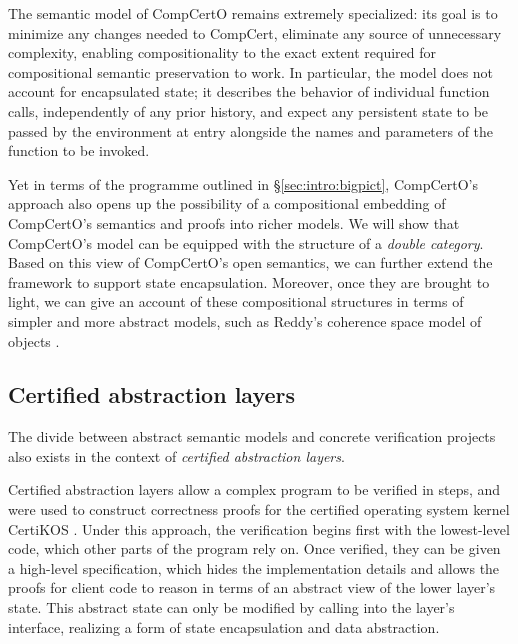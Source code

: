 \documentclass[acmsmall,screen,review,anonymous]{acmart}
\begin{document}
The semantic model of CompCertO
remains extremely specialized:
its goal is to minimize any changes needed to CompCert,
eliminate any source of unnecessary complexity,
enabling compositionality
to the exact extent required
for compositional semantic preservation to work.
In particular,
the model does not account for
encapsulated state;
it describes the behavior of individual function calls,
independently of any prior history,
and expect any persistent state
to be passed by the environment at entry
alongside the names and parameters of the function to be invoked.

Yet
in terms of the programme outlined in \S\ref{sec:intro:bigpict},
CompCertO's approach also opens up the possibility
of a compositional embedding
of CompCertO's semantics and proofs
into richer models.
We will show that CompCertO's model
can be equipped with the structure of
a \emph{double category}.
Based on this view
of CompCertO's open semantics,
we can further extend the framework
to support state encapsulation.
Moreover,
once they are brought to light,
we can give an account of
these compositional structures
in terms of simpler and more abstract models,
such as Reddy's
coherence space model of objects
\cite{objsem}.



\subsection{Certified abstraction layers} %

The divide between abstract semantic models
and concrete verification projects
also exists in the context of \emph{certified abstraction layers}.

Certified abstraction layers
allow a complex program to be verified in steps,
and were used to construct correctness proofs
for the certified operating system kernel CertiKOS
\cite{popl15,ccal}.
Under this approach,
the verification begins first with the lowest-level code,
which other parts of the program rely on.
Once verified,
they can be given a high-level specification,
which hides the implementation details
and allows the proofs for client code
to reason in terms of an abstract view
of the lower layer's state.
This abstract state
can only be modified by calling into
the layer's interface,
realizing a form of state encapsulation
and data abstraction.
\end{document}
